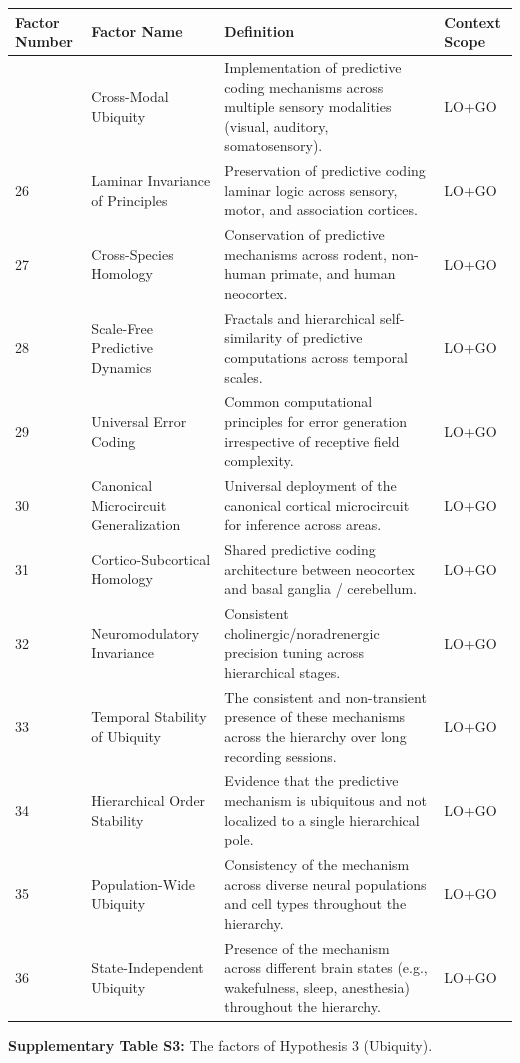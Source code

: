 \documentclass[12pt]{article}
\begin{document}
\begin{longtable}[]{@{}llll@{}}
\toprule
\textbf{Factor Number} & \textbf{Factor Name} & \textbf{Definition} & \textbf{Context Scope} \\
\midrule
\endhead
\bottomrule
\endlastfoot
25 & Cross-Modal Ubiquity & Implementation of predictive coding mechanisms across multiple sensory modalities (visual, auditory, somatosensory). & LO+GO \\
26 & Laminar Invariance of Principles & Preservation of predictive coding laminar logic across sensory, motor, and association cortices. & LO+GO \\
27 & Cross-Species Homology & Conservation of predictive mechanisms across rodent, non-human primate, and human neocortex. & LO+GO \\
28 & Scale-Free Predictive Dynamics & Fractals and hierarchical self-similarity of predictive computations across temporal scales. & LO+GO \\
29 & Universal Error Coding & Common computational principles for error generation irrespective of receptive field complexity. & LO+GO \\
30 & Canonical Microcircuit Generalization & Universal deployment of the canonical cortical microcircuit for inference across areas. & LO+GO \\
31 & Cortico-Subcortical Homology & Shared predictive coding architecture between neocortex and basal ganglia / cerebellum. & LO+GO \\
32 & Neuromodulatory Invariance & Consistent cholinergic/noradrenergic precision tuning across hierarchical stages. & LO+GO \\
33 & Temporal Stability of Ubiquity & The consistent and non-transient presence of these mechanisms across the hierarchy over long recording sessions. & LO+GO \\
34 & Hierarchical Order Stability & Evidence that the predictive mechanism is ubiquitous and not localized to a single hierarchical pole. & LO+GO \\
35 & Population-Wide Ubiquity & Consistency of the mechanism across diverse neural populations and cell types throughout the hierarchy. & LO+GO \\
36 & State-Independent Ubiquity & Presence of the mechanism across different brain states (e.g., wakefulness, sleep, anesthesia) throughout the hierarchy. & LO+GO \\
\end{longtable}

\textbf{Supplementary Table S3:} The factors of Hypothesis 3 (Ubiquity).
\end{document}
